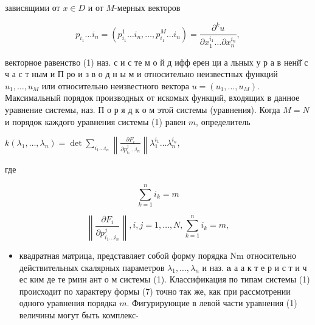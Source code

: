 \documentclass[10pt]{article}
\begin{document}
зависящими от $x \in D$ и от $M$-мерных векторов



\[

p_{i_{1}} \ldots i_{n}=\left(p_{i_{1}}^{1} \ldots i_{n}, \ldots, p_{i_{1}}^{M} \ldots i_{n}\right)=\frac{\partial^{k} u}{\partial x_{1}^{i_{1}} \ldots \partial x_{n}^{i_{n}}},

\]



векторное равенство (1) наз. с и с те м о й д ифф ерен ци а льных у р а в ненй̆ с ч а с т ным и П ро и з в о д н ы м и относительно неизвестных функций $u_{1}, \ldots, u_{M}$ или относительно неизвестного вектора $u=\left(u_{1}, \ldots, u_{M}\right)$. Максимальный порядок производных от искомых функций, входящих в данное уравнение системы, наз. П о р я д к о м этой системы (уравнения). Когда $M=N$ и порядок каждого уравнения системы (1) равен $m$, определитель



$k\left(\lambda_{1}, \ldots, \lambda_{n}\right)=\operatorname{det} \sum_{i_{1} \ldots i_{n}}\left\|\frac{\partial F_{i}}{\partial p_{i_{1}}^{j} \ldots i_{n}}\right\| \lambda_{1}^{i_{1}} \ldots \lambda_{n}^{i_{n}}$,



где



\[

\sum_{k=1}^{n} i_{k}=m

\]



\[

\left\|\frac{\partial F_{i}}{\partial p_{i_{1} \ldots i_{n}}^{j}}\right\|, i, j=1, \ldots, N, \sum_{k=1}^{n} i_{k}=m,

\]



\begin{itemize}

  \item квадратная матрица, представляет собой форму порядка $\mathrm{Nm}$ относительно действительных скалярных параметров $\lambda_{1}, \ldots, \lambda_{n}$ и наз. $\mathbf{a}$ а а к т е р и с т и ч ес ким де те рмин ант о м системы (1). Классификация по типам системы (1) происходит по характеру формы (7) точно так же, как при рассмотрении одного уравнения порядка $m$. Фигурирующие в левой части уравнения (1) величины могут быть комплекс-

\end{itemize}
\end{document}
